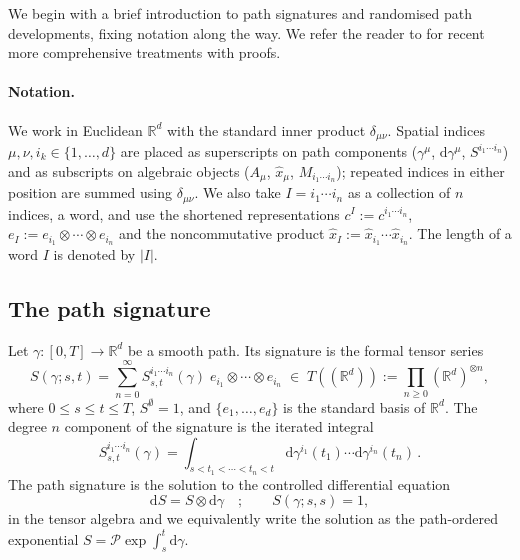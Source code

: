 \documentclass[11pt,a4paper]{article}
\newcommand{\xh}{\hat{x}}
\newcommand{\cP}{\mathcal{P}}
\newcommand{\dd}{\mathrm{d}}
\begin{document}
We begin with a brief introduction to path signatures and randomised path developments, fixing notation along the way. We refer the reader to \cite{cass2024lecture,chevyrev2025primer} for recent more comprehensive treatments with proofs.

\paragraph{Notation.}

We work in Euclidean $\mathbb{R}^d$ with the standard inner product $\delta_{\mu\nu}$. Spatial indices $\mu,\nu,i_k\in\{1,\ldots,d\}$ are placed as superscripts on path components ($\gamma^\mu$, $\dd\gamma^\mu$, $S^{i_1\cdots i_n}$) and as subscripts on algebraic objects ($A_\mu$, $\xh_\mu$, $M_{i_1\cdots i_n}$); repeated indices in either position are summed using $\delta_{\mu\nu}$. We also take $I= i_1\cdots i_n$ as a collection of $n$ indices, a word, and use the shortened representations $c^{I}:=c^{i_1\cdots i_n}$, $e_I:=e_{i_1}\otimes\cdots\otimes e_{i_n}$ and the noncommutative product $\xh_I:=\xh_{i_1} \cdots \xh_{i_n}$. The length of a word $I$ is denoted by $|I|$.

\subsection{The path signature}\label{sec:path-sig}

Let $\gamma\colon[0,T]\to\mathbb{R}^d$ be a smooth path.  Its signature is the formal tensor series
\begin{equation}\label{eq:sig}
  S(\gamma;s,t) = \sum_{n=0}^{\infty}
  S^{i_1\cdots i_n}_{s,t}(\gamma)\;
  e_{i_1}\otimes\cdots\otimes e_{i_n}
  \;\in\; T((\mathbb{R}^d)) 
  := \prod_{n\geq 0}(\mathbb{R}^d)^{\otimes n},
\end{equation}
where $0\le s\le t\le T$, $S^{\emptyset}=1$, and $\{e_1,\ldots,e_d\}$ is the standard basis of $\mathbb{R}^d$. The degree $n$ component of the signature is the iterated integral
\begin{equation}\label{eq:sig-comp}
  S^{i_1\cdots i_n}_{s,t}(\gamma) = 
  \int_{s<t_1<\cdots<t_n<t}
    \dd\gamma^{i_1}(t_1)\cdots\dd\gamma^{i_n}(t_n)\,.
\end{equation}
The path signature is the solution to the controlled differential equation
\begin{equation}\label{eq:ODE-path-sig}
\dd S = S\otimes\dd\gamma\quad;\qquad S(\gamma;s,s)=1,
\end{equation}
in the tensor algebra and we equivalently write the solution as the path-ordered exponential $S = \cP\exp\!\int_s^t\dd\gamma$. 
\end{document}
